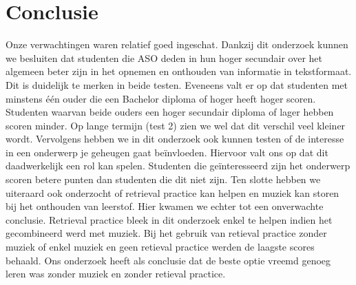 \documentclass{hogent-article}
\begin{document}
	\section{Conclusie}
	Onze verwachtingen waren relatief goed ingeschat. Dankzij dit onderzoek kunnen we besluiten dat studenten die ASO deden in hun hoger secundair over het algemeen beter zijn in het opnemen en onthouden van informatie in tekstformaat. Dit is duidelijk te merken in beide testen. Eveneens valt er op dat studenten met minstens één ouder die een Bachelor diploma of hoger heeft hoger scoren. Studenten waarvan beide ouders een hoger secundair diploma of lager hebben scoren minder. Op lange termijn (test 2) zien we wel dat dit verschil veel kleiner wordt. Vervolgens hebben we in dit onderzoek ook kunnen testen of de interesse in een onderwerp je geheugen gaat beïnvloeden. Hiervoor valt ons op dat dit daadwerkelijk een rol kan spelen. Studenten die geïnteresseerd zijn het onderwerp scoren betere punten dan studenten die dit niet zijn. Ten slotte hebben we uiteraard ook onderzocht of retrieval practice kan helpen en muziek kan storen bij het onthouden van leerstof. Hier kwamen we echter tot een onverwachte conclusie. Retrieval practice bleek in dit onderzoek enkel te helpen indien het gecombineerd werd met muziek. Bij het gebruik van retieval practice zonder muziek of enkel muziek en geen retieval practice werden de laagste scores behaald. Ons onderzoek heeft als conclusie dat de beste optie vreemd genoeg leren was zonder muziek en zonder retieval practice.
	
	
	
	\printbibliography[heading=bibintoc]
	
\end{document}
